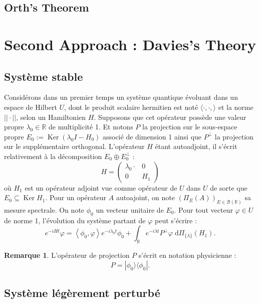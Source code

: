 \documentclass[12pt,openany,a4paper, titlepage]{article}
\newcommand{\lp}{\left(}
\newcommand{\rp}{\right)}
\newcommand{\la}{\left\langle}
\newcommand{\ra}{\right\rangle}
\newcommand{\dd}{\;\mathrm{d}}
\newcommand{\R}{\mathbb{R}}
\newcommand{\St}[2]{e^{-i #1 #2}}
\newcommand{\ortho}{P^\perp}
\newcommand{\Ker}{\operatorname{Ker}}
\theoremstyle{definition}
\theoremstyle{definition}
\theoremstyle{definition}
\theoremstyle{definition}
\theoremstyle{definition}
\newtheorem{rem}{Remarque}
\theoremstyle{definition}
\begin{document}
\subsection{Orth's Theorem}

\section{Second Approach : Davies's Theory}

\subsection{Système stable}

Considérons dans un premier temps un système quantique évoluant dans un espace de Hilbert $U$, dont le produit scalaire hermitien est noté $\langle \cdot, \cdot, \rangle$ et la norme $||\cdot ||$, selon un Hamiltonien $H$. Supposons que cet opérateur possède une valeur propre $\lambda_0 \in \R$ de multiplicité 1. Et notons $P$ la projection sur le sous-espace propre $E_0 := \Ker\lp \lambda_0 I - H_0 \rp$ associé de dimension 1 ainsi que $\ortho$ la projection sur le supplémentaire orthogonal. L'opérateur $H$ étant autoadjoint, il s'écrit relativement à la décomposition $E_0\oplus E_0^\perp$ :
\begin{equation}
    H = \begin{pmatrix}
    \lambda_0 \cdot & 0 \\
    0 & H_1 
\end{pmatrix}
\end{equation}
où $H_1$ est un opérateur adjoint vue comme opérateur de $U$ dans $U$ de sorte que $E_0 \subseteq \Ker H_1$. Pour un opérateur $A$ autoajoint, on note $\lp\Pi_E(A)\rp_{E\in\mathcal{B}(\R)}$ sa mesure spectrale. On note $\phi_0$ un vecteur unitaire de $E_0$. Pour tout vecteur $\varphi \in U$ de norme 1, l'évolution du système partant de $\varphi$ peut s'écrire :
$$\St{H}{t}\varphi = \la \phi_0, \varphi \ra \St{\lambda_0}{t} \phi_0 + \int_\R \St{\lambda}{t}\ortho \varphi \dd \Pi_{\{\lambda\}}(H_1).$$

\begin{rem}
L'opérateur de projection $P$ s'écrit en notation physicienne : $$ P = |\phi_0\rangle \langle \phi_0|.$$
\end{rem}

\subsection{Système légèrement perturbé}
\end{document}

